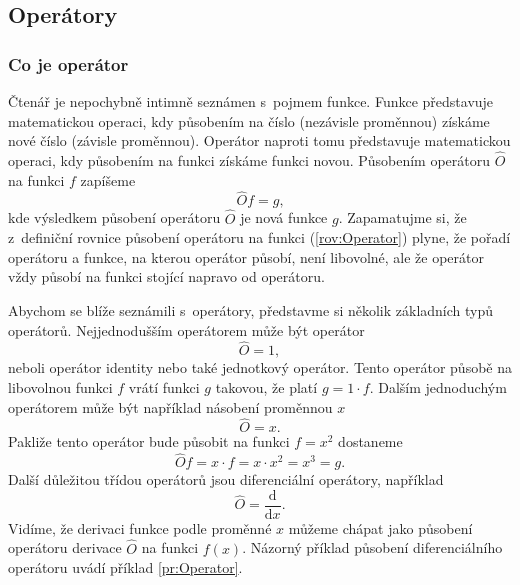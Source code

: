 \newpage

\subsection{Operátory}
\label{kap:Operatory}

\subsubsection{Co je operátor}

Čtenář je nepochybně intimně seznámen s~pojmem funkce. Funkce představuje matematickou operaci, kdy působením na číslo (nezávisle proměnnou) získáme nové číslo (závisle proměnnou). Operátor naproti tomu představuje matematickou operaci, kdy působením na funkci získáme funkci novou. Působením operátoru $\hat{O}$ na funkci $f$ zapíšeme
\begin{equation}
\boxed{\hat{O} f = g \mbox{,}}
\label{rov:Operator}
\end{equation}
kde výsledkem působení operátoru $\hat{O}$ je nová funkce $g$. Zapamatujme si, že z~definiční rovnice působení operátoru na funkci (\ref{rov:Operator}) plyne, že pořadí operátoru a funkce, na kterou operátor působí, není libovolné, ale že operátor vždy působí na funkci stojící napravo od operátoru.

Abychom se blíže seznámili s~operátory, představme si několik základních typů operátorů. Nejjednodušším operátorem může být operátor
\begin{equation}
\hat{O} = 1,
\nonumber
\end{equation}
neboli operátor identity nebo také jednotkový operátor. Tento operátor působě na libovolnou funkci $f$ vrátí funkci $g$ takovou, že platí $g=1 \cdot f$. Dalším jednoduchým operátorem může být například násobení proměnnou $x$
\begin{equation}
\hat{O} = x.
\nonumber
\end{equation}
Pakliže tento operátor bude působit na funkci $f = x^2$ dostaneme
\begin{equation}
\hat{O} f = x \cdot f = x \cdot x^2 = x^3 = g.
\nonumber
\end{equation}
Další důležitou třídou operátorů jsou diferenciální operátory, například
\begin{equation}
\hat{O} = \frac{\mathrm{d}}{\mathrm{d}x}.
\nonumber
\end{equation}
Vidíme, že derivaci funkce podle proměnné $x$ můžeme chápat jako působení operátoru derivace $\hat{O}$ na funkci $f(x)$. Názorný příklad působení diferenciálního operátoru uvádí příklad \ref{pr:Operator}.

